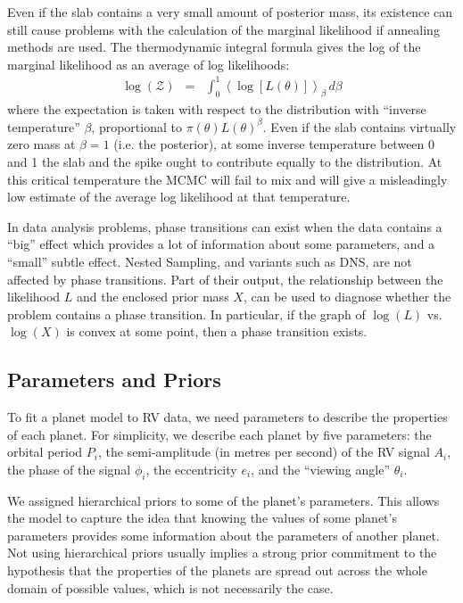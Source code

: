 \documentclass[useAMS,usenatbib]{mn2e}
\begin{document}
Even if the slab contains a very small amount of posterior mass, its existence
can still cause problems with the calculation of the marginal likelihood
if annealing methods are used. The thermodynamic integral formula gives
the log of the marginal likelihood as an average of log likelihoods:
\begin{eqnarray}
\log(\mathcal{Z}) &=& \int_0^1 \left<\log\left[L(\theta)\right]\right>_\beta \, d\beta
\end{eqnarray}
where the expectation is taken with respect to the
distribution with ``inverse temperature'' $\beta$, proportional to
$\pi(\theta)L(\theta)^\beta$. Even if the slab contains virtually zero mass
at $\beta=1$ (i.e. the posterior), at some inverse temperature between 0 and 1
the slab and the spike ought to contribute equally to the distribution. At
this critical temperature the MCMC will fail to mix and will give a misleadingly
low estimate of the average log likelihood at that temperature.

In data analysis problems, phase transitions can exist when the data contains
a ``big'' effect which provides a lot of information about some parameters, and
a ``small'' subtle effect.
Nested Sampling, and variants such as DNS, are not affected
by phase transitions. Part of their output, the relationship between the
likelihood $L$ and the enclosed prior mass $X$, can be used to diagnose whether the
problem contains a phase transition. In particular, if the graph of $\log(L)$
vs. $\log(X)$ is convex at some point, then a phase transition exists.

\subsection{Parameters and Priors}
To fit a planet model to RV data, we need parameters to describe
the properties of each planet. For simplicity, we describe each planet by
five parameters: the orbital period $P_i$, the semi-amplitude (in metres
per second) of the RV signal $A_i$, the phase of the signal
$\phi_i$, the eccentricity $e_i$, and the ``viewing angle'' $\theta_i$.

We assigned hierarchical priors to some of the planet's parameters. This allows the
model to capture the idea that knowing the values of some planet's parameters
provides some information about the parameters of another planet. Not using
hierarchical priors usually implies a strong prior commitment to the hypothesis
that the properties of the planets are spread out across the whole domain of
possible values, which is not necessarily the case.
\end{document}
